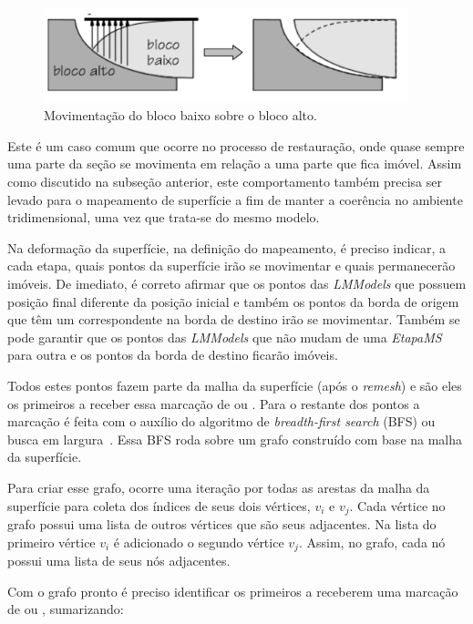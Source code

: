 \begin{figure} [H]
  \begin{center}
    \includegraphics[width=300pt]{images/fig-hang-foot-wall}
    \caption{Movimentação do bloco baixo sobre o bloco alto.~\cite{Santi}}\label{fig-hang-foot-wall}
  \end{center}
\end{figure}

Este é um caso comum que ocorre no processo de restauração, onde quase sempre uma parte da seção se movimenta em relação a uma parte que fica imóvel. Assim como discutido na subseção anterior, este comportamento também precisa ser levado para o mapeamento de superfície a fim de manter a coerência no ambiente tridimensional, uma vez que trata-se do mesmo modelo.

Na deformação da superfície, na definição do mapeamento, é preciso indicar, a cada etapa, quais pontos da superfície irão se movimentar e quais permanecerão imóveis. De imediato, é correto afirmar que os pontos das \textit{LMModels} que possuem posição final diferente da posição inicial e também os pontos da borda de origem que têm um correspondente na borda de destino irão se movimentar. Também se pode garantir que os pontos das \textit{LMModels} que não mudam de uma \textit{EtapaMS} para outra e os pontos da borda de destino ficarão imóveis.

Todos estes pontos fazem parte da malha da superfície (após o \textit{remesh}) e são eles os primeiros a receber essa marcação de  ou . Para o restante dos pontos a marcação é feita com o auxílio do algoritmo de \textit{breadth-first search} (BFS) ou busca em largura~\cite{Nilsson}. Essa BFS roda sobre um grafo construído com base na malha da superfície. 

Para criar esse grafo, ocorre uma iteração por todas as arestas da malha da superfície para coleta dos índices de seus dois vértices, $v_i$ e $v_j$. Cada vértice no grafo possui uma lista de outros vértices que são seus adjacentes. Na lista do primeiro vértice $v_i$ é adicionado o segundo vértice $v_j$. Assim, no grafo, cada nó possui uma lista de seus nós adjacentes.

Com o grafo pronto é preciso identificar os primeiros a receberem uma marcação de  ou , sumarizando:

